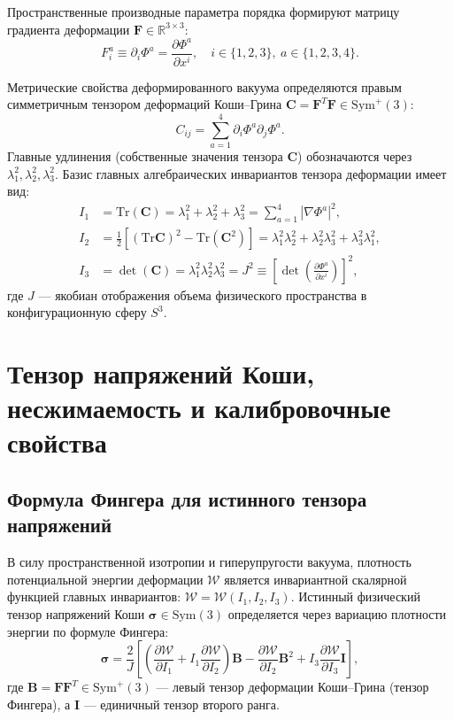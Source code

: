 \documentclass[12pt,a4paper]{article}
\begin{document}
	Пространственные производные параметра порядка формируют матрицу градиента деформации $\mathbf{F} \in \mathbb{R}^{3 \times 3}$:
	\begin{equation}
		F_i^a \equiv \partial_i \Phi^a = \frac{\partial \Phi^a}{\partial x^i}, \quad i \in \{1,2,3\}, \ a \in \{1,2,3,4\}.
	\end{equation}
	
	Метрические свойства деформированного вакуума определяются правым симметричным тензором деформаций Коши--Грина $\mathbf{C} = \mathbf{F}^T \mathbf{F} \in \mathrm{Sym}^+(3)$:
	\begin{equation}
		C_{ij} = \sum_{a=1}^4 \partial_i \Phi^a \partial_j \Phi^a.
	\end{equation}
	Главные удлинения (собственные значения тензора $\mathbf{C}$) обозначаются через $\lambda_1^2, \lambda_2^2, \lambda_3^2$. Базис главных алгебраических инвариантов тензора деформации имеет вид:
	\begin{align}
		I_1 &= \mathrm{Tr}(\mathbf{C}) = \lambda_1^2 + \lambda_2^2 + \lambda_3^2 = \sum_{a=1}^4 |\nabla \Phi^a|^2, \\
		I_2 &= \frac{1}{2} \left[ (\mathrm{Tr}\mathbf{C})^2 - \mathrm{Tr}(\mathbf{C}^2) \right] = \lambda_1^2 \lambda_2^2 + \lambda_2^2 \lambda_3^2 + \lambda_3^2 \lambda_1^2, \\
		I_3 &= \det(\mathbf{C}) = \lambda_1^2 \lambda_2^2 \lambda_3^2 = J^2 \equiv \left[ \det\left(\frac{\partial \Phi^a}{\partial x^i}\right) \right]^2,
	\end{align}
	где $J$ --- якобиан отображения объема физического пространства в конфигурационную сферу $S^3$.
	
	\section{Тензор напряжений Коши, несжимаемость и калибровочные свойства}
	
	\subsection{Формула Фингера для истинного тензора напряжений}
	В силу пространственной изотропии и гиперупругости вакуума, плотность потенциальной энергии деформации $\mathcal{W}$ является инвариантной скалярной функцией главных инвариантов: $\mathcal{W} = \mathcal{W}(I_1, I_2, I_3)$. Истинный физический тензор напряжений Коши $\boldsymbol{\sigma} \in \mathrm{Sym}(3)$ определяется через вариацию плотности энергии по формуле Фингера:
	\begin{equation}
		\boldsymbol{\sigma} = \frac{2}{J} \left[ \left( \frac{\partial \mathcal{W}}{\partial I_1} + I_1 \frac{\partial \mathcal{W}}{\partial I_2} \right) \mathbf{B} - \frac{\partial \mathcal{W}}{\partial I_2} \mathbf{B}^2 + I_3 \frac{\partial \mathcal{W}}{\partial I_3} \mathbf{I} \right],
	\end{equation}
	где $\mathbf{B} = \mathbf{F} \mathbf{F}^T \in \mathrm{Sym}^+(3)$ --- левый тензор деформации Коши--Грина (тензор Фингера), а $\mathbf{I}$ --- единичный тензор второго ранга.
	
\end{document}
